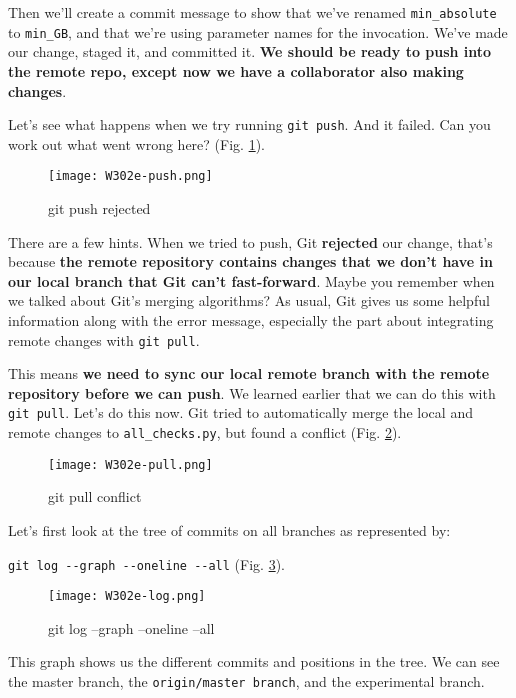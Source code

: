 	Then we'll create a commit message to show that we've renamed \verb|min_absolute| to \verb|min_GB|, and that we're using parameter names for the invocation.
	We've made our change, staged it, and committed it. \textbf{We should be ready to push into the remote repo, except now we have a collaborator also making changes}. 
	
	Let's see what happens when we try running \verb|git push|. And it failed. Can you work out what went wrong here? (Fig. \ref{W302e-push}).
	
	\begin{figure} 
		\caption{git push rejected}
		\centering
		\texttt{[image: W302e-push.png]}
		\label{W302e-push}
	\end{figure}
	
	There are a few hints. When we tried to push, Git \textbf{rejected} our change, that's because \textbf{the remote repository contains changes that we don't have in our local branch that Git can't fast-forward}. Maybe you remember when we talked about Git's merging algorithms? As usual, Git gives us some helpful information along with the error message, especially the part about integrating remote changes with \verb|git pull|.
	
	This means \textbf{we need to sync our local remote branch with the remote repository before we can push}. We learned earlier that we can do this with \verb|git pull|. Let's do this now. Git tried to automatically merge the local and remote changes to \verb|all_checks.py|, but found a conflict (Fig. \ref{W302e-pull}). 
	
	\begin{figure} 
		\caption{git pull conflict}
		\centering
		\texttt{[image: W302e-pull.png]}
		\label{W302e-pull}
	\end{figure}
	
	
	Let's first look at the tree of commits on all branches as represented by:
	
	\verb|git log --graph --oneline --all| (Fig. \ref{W302e-log}). 
	
	\begin{figure} 
		\caption{git log --graph --oneline --all}
		\centering
		\texttt{[image: W302e-log.png]}
		\label{W302e-log}
	\end{figure}
	
	This graph shows us the different commits and positions in the tree. We can see the master branch, the \verb|origin/master branch|, and the experimental branch. 
	
